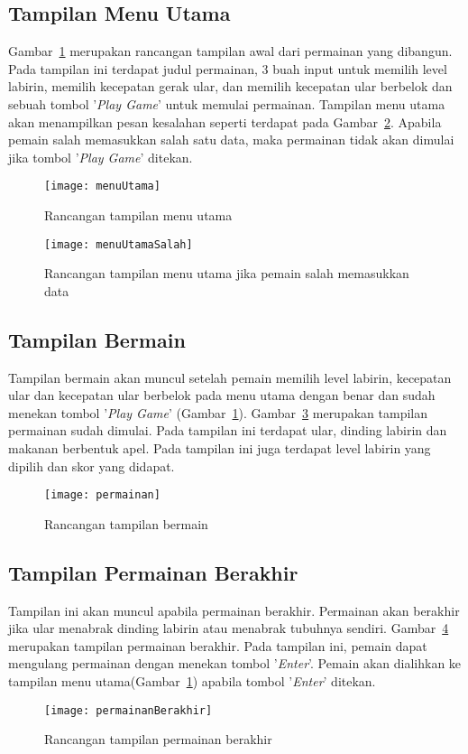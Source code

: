 \subsection{Tampilan Menu Utama}
Gambar~\ref{fig:menuUtama} merupakan rancangan tampilan awal dari permainan yang dibangun. Pada tampilan ini terdapat judul permainan, 3 buah input untuk memilih level labirin, memilih kecepatan gerak ular, dan memilih kecepatan ular berbelok dan sebuah tombol '\textit{Play Game}' untuk memulai permainan. Tampilan menu utama akan menampilkan pesan kesalahan seperti terdapat pada Gambar~\ref{fig:menuUtamaSalah}. Apabila pemain salah memasukkan salah satu data, maka permainan tidak akan dimulai jika tombol '\textit{Play Game}' ditekan.

\begin{figure}[H]
	\centering  
	\texttt{[image: menuUtama]}  
	\caption[Rancangan tampilan menu utama]{Rancangan tampilan menu utama}
	\label{fig:menuUtama} 
\end{figure}

\begin{figure}[H]
	\centering  
	\texttt{[image: menuUtamaSalah]}  
	\caption[Rancangan tampilan menu utama jika pemain salah memasukkan data]{Rancangan tampilan menu utama jika pemain salah memasukkan data}
	\label{fig:menuUtamaSalah} 
\end{figure}

\subsection{Tampilan Bermain}
Tampilan bermain akan muncul setelah pemain memilih level labirin, kecepatan ular dan kecepatan ular berbelok pada menu utama dengan benar dan sudah menekan tombol '\textit{Play Game}' (Gambar~\ref{fig:menuUtama}). Gambar~\ref{fig:permainan} merupakan tampilan permainan sudah dimulai. Pada tampilan ini terdapat ular, dinding labirin dan makanan berbentuk apel. Pada tampilan ini juga terdapat level labirin yang dipilih dan skor yang didapat. 

\begin{figure}[H]
	\centering  
	\texttt{[image: permainan]}  
	\caption[Rancangan tampilan bermain]{Rancangan tampilan bermain}
	\label{fig:permainan} 
\end{figure}

\subsection{Tampilan Permainan Berakhir}
Tampilan ini akan muncul apabila permainan berakhir. Permainan akan berakhir jika ular menabrak dinding labirin atau menabrak tubuhnya sendiri. Gambar~\ref{fig:permainanBerakhir} merupakan tampilan permainan berakhir. Pada tampilan ini, pemain dapat mengulang permainan dengan menekan tombol '\textit{Enter}'. Pemain akan dialihkan ke tampilan menu utama(Gambar~\ref{fig:menuUtama}) apabila tombol '\textit{Enter}' ditekan.

\begin{figure}[H]
	\centering  
	\texttt{[image: permainanBerakhir]}  
	\caption[Rancangan tampilan permainan berakhir]{Rancangan tampilan permainan berakhir}
	\label{fig:permainanBerakhir} 
\end{figure}